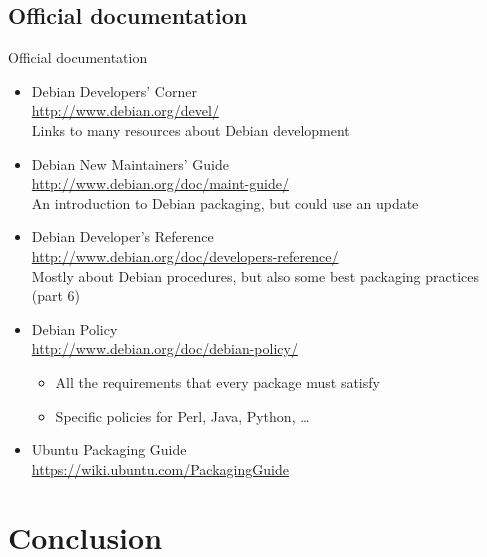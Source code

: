 \documentclass[10pt,final]{beamer}
\begin{document}
\subsection{Official documentation}
\begin{frame}{Official documentation}
  \begin{itemize}
  \item Debian Developers' Corner\\
    \url{http://www.debian.org/devel/}\\
    {\small Links to many resources about Debian development}
    \br
  \item Debian New Maintainers' Guide\\
    \url{http://www.debian.org/doc/maint-guide/}\\
    {\small An introduction to Debian packaging, but could use an update}
    \br
  \item Debian Developer's Reference\\
    \url{http://www.debian.org/doc/developers-reference/}\\
    {\small Mostly about Debian procedures, but also some best packaging practices (part 6)}
    \br
  \item Debian Policy\\
    \url{http://www.debian.org/doc/debian-policy/}\\
    
    {\small \begin{itemize}
      \item \small All the requirements that every package must satisfy
      \item \small Specific policies for Perl, Java, Python, \ldots
      \end{itemize}}
    \br
    
  \item Ubuntu Packaging Guide\\
    \url{https://wiki.ubuntu.com/PackagingGuide}
  \end{itemize}
\end{frame}

\section{Conclusion}
\end{document}
